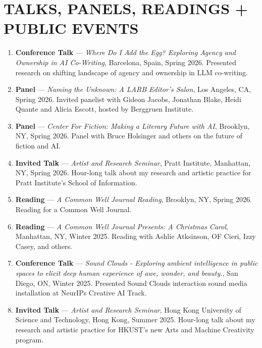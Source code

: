 \section{TALKS, PANELS, READINGS + PUBLIC EVENTS}

\begin{enumerate}

\item \textbf{Conference Talk} --- \emph{Where Do I Add the Egg? Exploring Agency and Ownership in AI Co-Writing}, Barcelona, Spain, Spring 2026. 
\subitem Presented research on shifting landscape of agency and ownership in LLM co-writing.

\item \textbf{Panel} --- \emph{Naming the Unknown: A LARB Editor's Salon}, Los Angeles, CA, Spring 2026. 
\subitem Invited panelist with Gideon Jacobs, Jonathan Blake, Heidi Quante and Alicia Escott, hosted by Berggruen Institute.

\item \textbf{Panel} --- \emph{Center For Fiction: Making a Literary Future with AI}, Brooklyn, NY, Spring 2026. 
\subitem Panel with Bruce Holsinger and others on the future of fiction and AI. 

\item \textbf{Invited Talk} --- \emph{Artist and Research Seminar}, Pratt Institute, Manhattan, NY, Spring 2026. 
\subitem Hour-long talk about my research and artistic practice for Pratt Institute's School of Information.

\item \textbf{Reading} --- \emph{A Common Well Journal Reading}, Brooklyn, NY, Spring 2026. 
\subitem Reading for a Common Well Journal.
\item \textbf{Reading} --- \emph{A Common Well Journal Presents: A Christmas Carol}, Manhattan, NY, Winter 2025.
\subitem Reading with Ashlie Atksinson, OF Cieri, Izzy Casey, and others.

\item \textbf{Conference Talk} --- \emph{Sound Clouds - Exploring ambient intelligence in
public spaces to elicit deep human experience of awe, wonder, and beauty.}, San Diego, ON, Winter 2025.
\subitem Presented Sound Clouds interaction sound media installation at NeurIPs Creative AI Track.

\item \textbf{Invited Talk} --- \emph{Artist and Research Seminar}, Hong Kong University of Science and Technology, Hong Kong, Summer 2025. 
\subitem Hour-long talk about my research and artistic practice for HKUST's new Arts and Machine Creativity program.


\end{enumerate}
